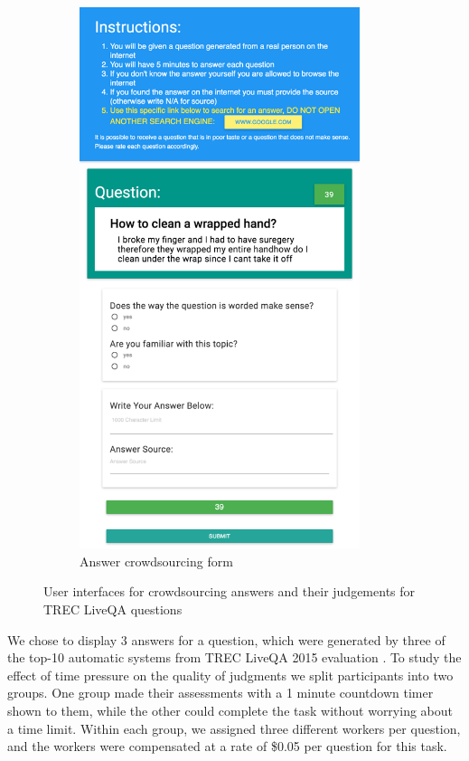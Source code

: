 \begin{figure}[t!]
\begin{subfigure}[b]{0.45\textwidth}
  \includegraphics[width=0.9\textwidth]{img/answering_screenshot}
  \caption{Answer crowdsourcing form}
  \label{fig:non-factoid:crowd:interfaces:answer}
  \end{subfigure}
\caption{User interfaces for crowdsourcing answers and their judgements for TREC LiveQA questions}
\label{fig:non-factoid:crowd:interfaces}
\end{figure}

We chose to display 3 answers for a question, which were generated by three of the top-10 automatic systems from TREC LiveQA 2015 evaluation \cite{overviewliveqa15}.
To study the effect of time pressure on the quality of judgments we split participants into two groups. One group made their assessments with a 1 minute countdown timer shown to them, while the other could complete the task without worrying about a time limit.
Within each group, we assigned three different workers per question, and the workers were compensated at a rate of \$0.05 per question for this task.

